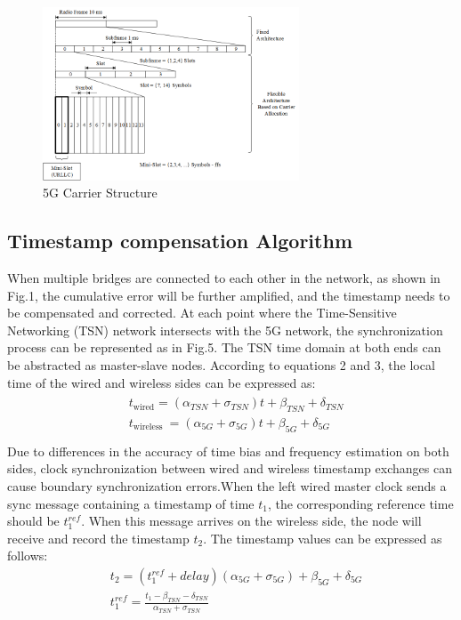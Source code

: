 \documentclass[english]{cccconf}
\begin{document}
\begin{figure}[htbp]
	\centering
	\setcounter{figure}{4}
	\includegraphics[width=3in]{fig14.png}
	\caption{5G Carrier Structure}
\end{figure}
\subsection{Timestamp compensation Algorithm}
When multiple bridges are connected to each other in the network, as shown in Fig.1, the cumulative error will be further amplified, and the timestamp needs to be compensated and corrected. At each point where the Time-Sensitive Networking (TSN) network intersects with the 5G network, the synchronization process can be represented as in Fig.5. The TSN time domain at both ends can be abstracted as master-slave nodes. According to equations 2 and 3, the local time of the wired and wireless sides can be expressed as:
\begin{eqnarray}
	\begin{aligned}
		&t_{\text {wired}}=\left(\alpha_{TSN}+\sigma_{TSN}\right) t+\beta_{TSN}+\delta_{TSN}\\
		&t_{\text {wireless }}=\left(\alpha_{5G}+\sigma_{5G}\right) t+\beta_{5G}+\delta_{5G}\\
	\end{aligned}
\end{eqnarray}
Due to differences in the accuracy of time bias and frequency estimation on both sides, clock synchronization between wired and wireless timestamp exchanges can cause boundary synchronization errors.When the left wired master clock sends a sync message containing a timestamp of time $t_1$, the corresponding reference time should be $t_1^{ref}$. When this message arrives on the wireless side, the node will receive and record the timestamp $t_2$. The timestamp values can be expressed as follows:
\begin{equation}
	\begin{split}
		&t_{2}=(t_1^{ref}+delay)(\alpha_{5G}+\sigma_{5G})+\beta_{5G}+\delta_{5G} \\
		&t_1^{ref}=\frac{t_{1}-\beta_{TSN}-\delta_{TSN}}{\alpha_{TSN}+\sigma_{TSN}}
	\end{split}
\end{equation}
\end{document}
